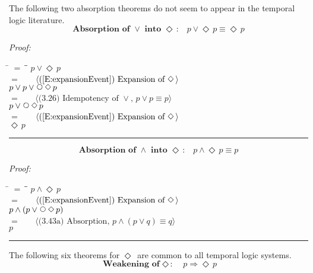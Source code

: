 \documentclass[fleqn, leqno]{article}
\newcommand{\lgap}{2pt}                             %
\newcommand{\mymathindent}{24pt}                    %
\newcommand{\impl}{\ensuremath{\Rightarrow}}        %
\newcommand{\Next}{\;\,\text{\raisebox{3.5pt}{\circle{6}}}}
\newcommand{\Event}{\Diamond\,}
\newcommand{\myqed}{\rule[-.23ex]{1.2ex}{2.0ex}}
\newcommand{\myqedtab}{\hspace{388.5pt}}              %
\newcommand{\Gll} {\langle}                         %
\newcommand{\Ggg} {\rangle}                         %
\newcommand{\Hint}[1]     {\ \ \ $\Gll              \mbox{#1} \Ggg$ }   %
\begin{document}

The following two absorption theorems do not seem to appear in the temporal logic literature.
\begin{equation}\label{E:absOrIntoEvent}
\textbf{Absorption of $\lor$ into $\Event$:}\quad p \lor \Event p \equiv \Event p
\end{equation}

\emph{Proof:}
\begin{tabbing}
\hspace{\mymathindent} \= $= \;$ \= \myqedtab \= \kill
  \> \>   $p \lor \Event p$\\[\lgap]
  \> $=$  \>  \Hint{(\ref{E:expansionEvent}) Expansion of $\Event$}\\[\lgap]
  \> \>   $p \lor p \lor \Next\Event p$\\[\lgap]
  \> $=$  \>  \Hint{(3.26) Idempotency of $\lor$, $p\lor p \equiv p$}\\[\lgap]
  \> \>   $p \lor \Next\Event p$\\[\lgap]
  \> $=$  \>  \Hint{(\ref{E:expansionEvent}) Expansion of $\Event$}\\[\lgap]
  \> \>   $\Event p$ \> \myqed
\end{tabbing}

\begin{equation}\label{E:absAndIntoEvent}
\textbf{Absorption of $\land$ into $\Event$:}\quad p \land \Event p \equiv p
\end{equation}

\emph{Proof:}
\begin{tabbing}
\hspace{\mymathindent} \= $= \;$ \= \myqedtab \= \kill
  \> \>   $p \land \Event p$\\[\lgap]
  \> $=$  \>  \Hint{(\ref{E:expansionEvent}) Expansion of $\Event$}\\[\lgap]
  \> \>   $p \land (p \lor \Next\Event p)$\\[\lgap]
  \> $=$  \>  \Hint{(3.43a) Absorption, $p\land (p \lor q) \equiv q$}\\[\lgap]
  \> \>   $p$ \> \myqed
\end{tabbing}

The following six theorems for $\Event$ are common to all temporal logic systems.
\begin{equation}\label{E:impEvent}
\textbf{Weakening of $\Event$:}\quad p \impl \Event p
\end{equation}
\end{document}
